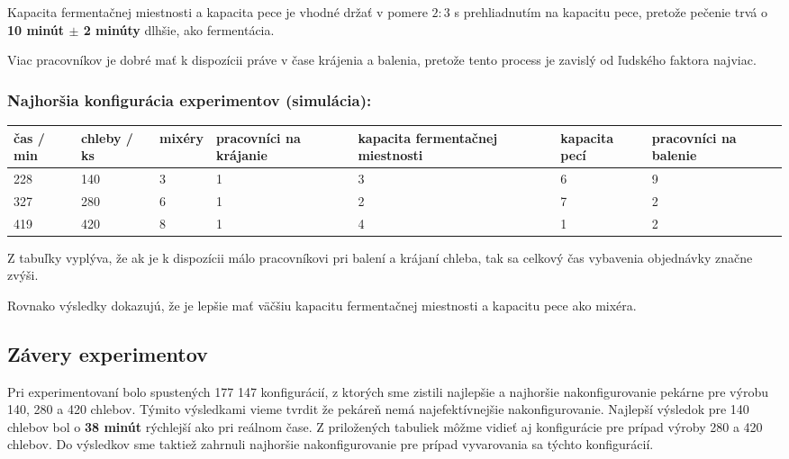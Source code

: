 \documentclass[a4paper, 10pt]{article}
\begin{document}
    Kapacita fermentačnej miestnosti a kapacita pece
    je vhodné držať v pomere $2:3$ s prehliadnutím na kapacitu pece, pretože
    pečenie trvá o \textbf{10 minút $\pm$ 2 minúty} dlhšie, ako fermentácia.

    Viac pracovníkov je dobré mať k dispozícii práve v čase krájenia a balenia, pretože
    tento process je zavislý od ľudského faktora najviac.

    \subsubsection{Najhoršia konfigurácia experimentov (simulácia):}
    \begin{center}
        \begin{tabular}{ |p{2cm}|p{2cm}|p{2cm}|p{2cm}|p{2cm}|p{2cm}|p{2cm}| }
            \hline
            čas / min & chleby / ks & mixéry & pracovníci na krájanie & kapacita fermentačnej miestnosti & kapacita pecí & pracovníci na balenie \\
            \hline\hline
            228       & 140         & 3      & 1                      & 3                                & 6             & 9                     \\ \hline
            327       & 280         & 6      & 1                      & 2                                & 7             & 2                     \\ \hline
            419       & 420         & 8      & 1                      & 4                                & 1             & 2                     \\ \hline
        \end{tabular}
    \end{center}

    Z tabuľky vyplýva, že ak je k dispozícii málo pracovníkovi pri balení a krájaní
    chleba, tak sa celkový čas vybavenia objednávky značne zvýši.

    Rovnako výsledky dokazujú, že je lepšie mať väčšiu kapacitu fermentačnej miestnosti
    a kapacitu pece ako mixéra.

    \subsection{Závery experimentov}
    Pri experimentovaní bolo spustených 177 147 konfigurácií, z ktorých sme zistili najlepšie a najhoršie nakonfigurovanie
    pekárne pre výrobu 140, 280 a 420 chlebov. Týmito výsledkami vieme tvrdit že pekáreň nemá najefektívnejšie nakonfigurovanie.
    Najlepší výsledok pre 140 chlebov bol o \textbf{38 minút} rýchlejší ako pri reálnom čase. Z priložených tabuliek
    môžme vidieť aj konfigurácie pre prípad výroby 280 a 420 chlebov. Do výsledkov sme taktiež zahrnuli najhoršie nakonfigurovanie
    pre prípad vyvarovania sa týchto konfigurácií.
\end{document}
